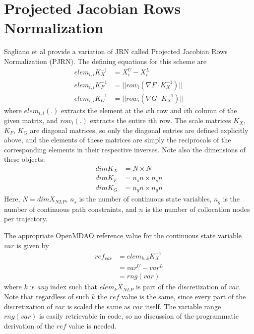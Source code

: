\documentclass{article}
\begin{document}
	
\section{Projected Jacobian Rows Normalization}

Sagliano et al provide a variation of JRN called Projected Jacobian Rows Normalization (PJRN). The defining equations for this scheme are
\begin{align*}
	elem_{i,i}K^{-1}_X &= X^{U}_i - X^{L}_i \\
	elem_{i,i}K^{-1}_F &= ||row_{i}(\nabla F \cdot K^{-1}_X)|| \\
	elem_{i,i}K^{-1}_G &= ||row_{i}(\nabla G \cdot K^{-1}_X)||
\end{align*}
where $elem_{i,i}(.)$ extracts the element at the $i$th row and $i$th column of the given matrix, and $row_{i}(.)$ extracts the entire $i$th row. The scale matrices $K_X$, $K_F$, $K_G$ are diagonal matrices, so only the diagonal entries are defined explicitly above, and the elements of these matrices are simply the reciprocals of the corresponding elements in their respective inverses. Note also the dimensions of these objects:
\begin{align*}
	dimK_X &= N \times N \\
	dimK_F &= n_sn \times n_sn \\
	dimK_G &= n_gn \times n_gn
\end{align*}
Here, $N = dimX_{NLP}$, $n_s$ is the number of continuous state variables, $n_g$ is the number of continuous path constraints, and $n$ is the number of collocation nodes per trajectory.

The appropriate OpenMDAO reference value for the continuous state variable $var$ is given by
\begin{align*}
	ref_{var} &= elem_{k,k}K^{-1}_X \\
	&= var^U - var^L \\
	&= rng(var)
\end{align*}
where $k$ is \textit{any} index such that $elem_{k}X_{NLP}$ is part of the discretization of $var$. Note that regardless of such $k$ the $ref$ value is the same, since every part of the discretization of $var$ is scaled the same as $var$ itself. The variable range $rng(var)$ is easily retrievable in code, so no discussion of the programmatic derivation of the $ref$ value is needed.
\end{document}
